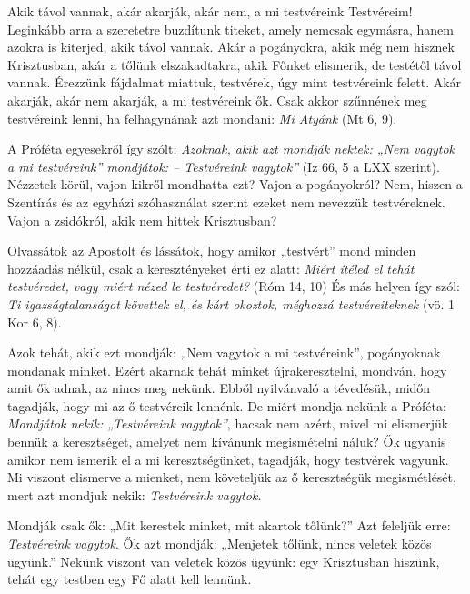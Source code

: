 \documentclass[twoside]{article}
\begin{document}
\begin{lectio}{Akik távol vannak, akár akarják, akár nem, a mi testvéreink}
\noindent Testvéreim! Leginkább arra a szeretetre buzdítunk titeket, amely nemcsak egymásra, hanem azokra is kiterjed, akik távol vannak. Akár a pogányokra, akik még nem hisznek Krisztusban, akár a tőlünk elszakadtakra, akik Főnket elismerik, de testétől távol vannak. Érezzünk fájdalmat miattuk, testvérek, úgy mint testvéreink felett. Akár akarják, akár nem akarják, a mi testvéreink ők. Csak akkor szűnnének meg testvéreink lenni, ha felhagynának azt mondani: \textit{Mi Atyánk} (Mt 6, 9).

A Próféta egyesekről így szólt: \textit{Azoknak, akik azt mondják nektek: „Nem vagytok a mi testvéreink” mondjátok: – Testvéreink vagytok”} (Iz 66, 5 a LXX szerint). Nézzetek körül, vajon kikről mondhatta ezt? Vajon a pogányokról? Nem, hiszen a Szentírás és az egyházi szóhasználat szerint ezeket nem nevezzük testvéreknek. Vajon a zsidókról, akik nem hittek Krisztusban?

Olvassátok az Apostolt és lássátok, hogy amikor „testvért” mond minden hozzáadás nélkül, csak a keresztényeket érti ez alatt: \textit{Miért ítéled el tehát testvéredet, vagy miért nézed le testvéredet?} (Róm 14, 10) És más helyen így szól: \textit{Ti igazságtalanságot követtek el, és kárt okoztok, méghozzá testvéreiteknek} (vö. 1 Kor 6, 8).

Azok tehát, akik ezt mondják: „Nem vagytok a mi testvéreink”, pogányoknak mondanak minket. Ezért akarnak tehát minket újrakeresztelni, mondván, hogy amit ők adnak, az nincs meg nekünk. Ebből nyilvánvaló a tévedésük, midőn tagadják, hogy mi az ő testvéreik lennénk. De miért mondja nekünk a Próféta: \textit{Mondjátok nekik: „Testvéreink vagytok”}, hacsak nem azért, mivel mi elismerjük bennük a keresztséget, amelyet nem kívánunk megismételni náluk? Ők ugyanis amikor nem ismerik el a mi keresztségünket, tagadják, hogy testvérek vagyunk. Mi viszont elismerve a mienket, nem követeljük az ő keresztségük megismétlését, mert azt mondjuk nekik: \textit{Testvéreink vagytok}.

Mondják csak ők: „Mit kerestek minket, mit akartok tőlünk?” Azt feleljük erre: \textit{Testvéreink vagytok}. Ők azt mondják: „Menjetek tőlünk, nincs veletek közös ügyünk.” Nekünk viszont van veletek közös ügyünk: egy Krisztusban hiszünk, tehát egy testben egy Fő alatt kell lennünk.


\end{lectio}
\end{document}
